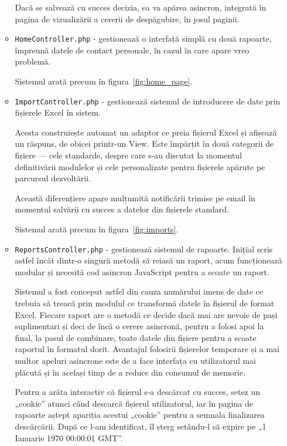\begin{itemize}
\begin{itemize}
				Dacă se salvează cu succes decizia, ea va apărea asincron, integrată în pagina de vizualizării a cererii de despăgubire, în josul paginii.
				\item \verb|HomeController.php| - gestionează o interfață simplă cu două rapoarte, împreună datele de contact personale, în cazul în care apare vreo problemă.

				Sistemul arată precum în figura~\ref{fig:home_page}.

				\item \verb|ImportController.php| - gestionează sistemul de introducere de date prin fișierele Excel în sistem.

				Acesta construiește automat un adaptor ce preia fișierul Excel și afișează un răspuns, de obicei printr-un View.
				Este împărțit în două categorii de fișiere --- cele standarde, despre care s-au discutat la momentul definitivării modulelor și cele personalizate pentru fișierele apărute pe parcursul dezvoltării.

				Această diferențiere apare mulțumită notificării trimise pe email în momentul salvării cu succes a datelor din fișierele standard.

				Sistemul arată precum în figura~\ref{fig:imports}.

				\item \verb|ReportsController.php| - gestionează sistemul de rapoarte.
				Inițial scris astfel încât dintr-o singură metodă să reiasă un raport, acum funcționează modular și necesită cod asincron JavaScript pentru a scoate un raport.

				Sistemul a fost conceput astfel din cauza numărului imens de date ce trebuia să treacă prin modulul ce transformă datele în fișierul de format Excel.
				Fiecare raport are o metodă ce decide dacă mai are nevoie de pași suplimentari și deci de încă o cerere asincronă, pentru a folosi apoi la final, la pasul de combinare, toate datele din fișiere pentru a scoate raportul în formatul dorit.
				Avantajul folosirii fișierelor temporare și a mai multor apeluri asincrone este de a face interfața cu utilizatorul mai plăcută și în același timp de a reduce din consumul de memorie.

				Pentru a arăta interactiv că fișierul s-a descărcat cu succes, setez un „cookie” atunci când descarcă fișierul utilizatorul, iar în pagina de rapoarte aștept apariția acestui „cookie” pentru a semnala finalizarea descărcării.
				După ce l-am identificat, îl șterg setându-l să expire pe „1 Ianuarie 1970 00:00:01 GMT”.


\end{itemize}
\end{itemize}
